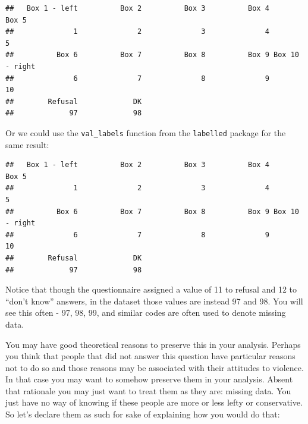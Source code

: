 \documentclass[
]{book}
\newenvironment{Shaded}{\begin{snugshade}}{\end{snugshade}}
\newcommand{\FunctionTok}[1]{\textcolor[rgb]{0.00,0.00,0.00}{#1}}
\newcommand{\NormalTok}[1]{#1}
\newcommand{\SpecialCharTok}[1]{\textcolor[rgb]{0.00,0.00,0.00}{#1}}
\begin{document}
\begin{Shaded}
\end{Shaded}

\begin{verbatim}
##   Box 1 - left          Box 2          Box 3          Box 4          Box 5 
##              1              2              3              4              5 
##          Box 6          Box 7          Box 8          Box 9 Box 10 - right 
##              6              7              8              9             10 
##        Refusal             DK 
##             97             98
\end{verbatim}

Or we could use the \texttt{val\_labels} function from the \texttt{labelled} package for the same result:

\begin{Shaded}
\end{Shaded}

\begin{verbatim}
##   Box 1 - left          Box 2          Box 3          Box 4          Box 5 
##              1              2              3              4              5 
##          Box 6          Box 7          Box 8          Box 9 Box 10 - right 
##              6              7              8              9             10 
##        Refusal             DK 
##             97             98
\end{verbatim}

Notice that though the questionnaire assigned a value of 11 to refusal and 12 to ``don't know'' answers, in the dataset those values are instead 97 and 98. You will see this often - 97, 98, 99, and similar codes are often used to denote missing data.

You may have good theoretical reasons to preserve this in your analysis. Perhaps you think that people that did not answer this question have particular reasons not to do so and those reasons may be associated with their attitudes to violence. In that case you may want to somehow preserve them in your analysis. Absent that rationale you may just want to treat them as they are: missing data. You just have no way of knowing if these people are more or less lefty or conservative. So let's declare them as such for sake of explaining how you would do that:
\end{document}
